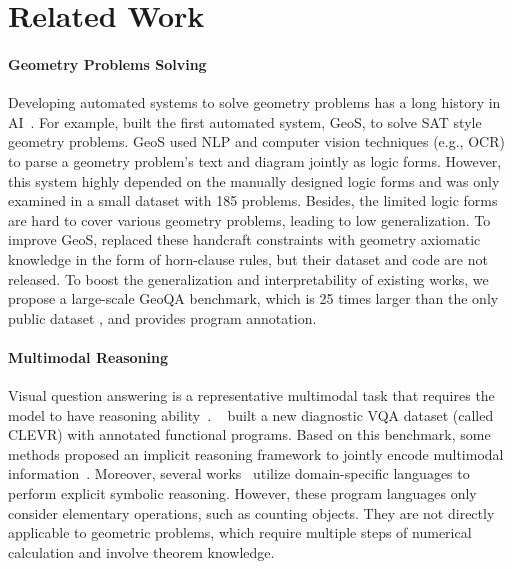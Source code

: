 \documentclass[11pt,a4paper]{article}
\begin{document}
\section{Related Work}
\paragraph{Geometry Problems Solving} 
Developing automated systems to solve geometry problems has a long history in AI~\cite{old1, old2,old3,jgex}. 
For example, \citet{seo2014diagram,seo2015solving} built the first automated system, GeoS, to solve SAT style geometry problems. GeoS used NLP and computer vision techniques (e.g., OCR) to parse a geometry problem’s text and diagram jointly as logic forms.
However, this system highly depended on the manually designed logic forms and was only examined in a small dataset with 185 problems. Besides, the limited logic forms are hard to cover various geometry problems, leading to low generalization. To improve GeoS,   \citet{sachan2017textbooks, sachan2017learning} replaced these handcraft constraints with geometry axiomatic knowledge in the form of horn-clause rules, but their dataset and code are not released. 
To boost the generalization and interpretability of existing works, we propose a large-scale GeoQA benchmark, which is 25 times larger than the only public dataset \citet{seo2015solving}, and provides program annotation. 








\paragraph{Multimodal Reasoning}
Visual question answering is a representative multimodal task that requires the model to have reasoning ability~\cite{goyal2017making,yu2019deep}. ~\citet{johnson2017clevr} built a new diagnostic VQA dataset (called CLEVR) with annotated functional programs. Based on this benchmark, some methods proposed an implicit reasoning framework to jointly encode multimodal information~\cite{perez2017film,santoro2017simple}. Moreover, several works~\cite{yi2018neural,mao2019neuro} utilize domain-specific languages to perform explicit symbolic reasoning. However, these program languages only consider elementary operations, such as counting objects. They are not directly applicable to geometric problems, which require multiple steps of numerical calculation and involve theorem knowledge. 
\end{document}
